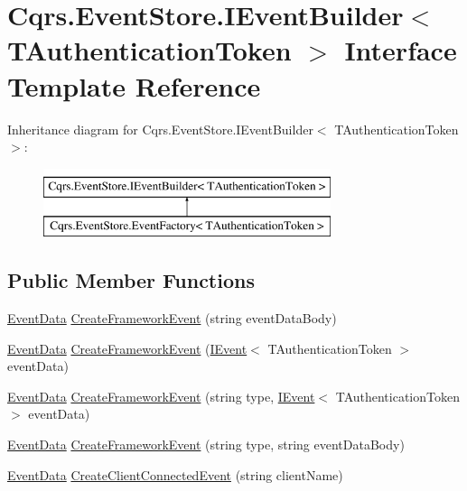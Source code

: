 \hypertarget{interfaceCqrs_1_1EventStore_1_1IEventBuilder}{}\section{Cqrs.\+Event\+Store.\+I\+Event\+Builder$<$ T\+Authentication\+Token $>$ Interface Template Reference}
\label{interfaceCqrs_1_1EventStore_1_1IEventBuilder}
Inheritance diagram for Cqrs.\+Event\+Store.\+I\+Event\+Builder$<$ T\+Authentication\+Token $>$\+:\begin{figure}[H]
\begin{center}
\leavevmode
\includegraphics[height=2.000000cm]{interfaceCqrs_1_1EventStore_1_1IEventBuilder}
\end{center}
\end{figure}
\subsection*{Public Member Functions}
\begin{DoxyCompactItemize}
\item 
\hyperlink{classCqrs_1_1Events_1_1EventData}{Event\+Data} \hyperlink{interfaceCqrs_1_1EventStore_1_1IEventBuilder_a341d5c54ef8a271a8248e0a5266e6228_a341d5c54ef8a271a8248e0a5266e6228}{Create\+Framework\+Event} (string event\+Data\+Body)
\item 
\hyperlink{classCqrs_1_1Events_1_1EventData}{Event\+Data} \hyperlink{interfaceCqrs_1_1EventStore_1_1IEventBuilder_a8ee9560f7b53c67b9946c3b0719eca96_a8ee9560f7b53c67b9946c3b0719eca96}{Create\+Framework\+Event} (\hyperlink{interfaceCqrs_1_1Events_1_1IEvent}{I\+Event}$<$ T\+Authentication\+Token $>$ event\+Data)
\item 
\hyperlink{classCqrs_1_1Events_1_1EventData}{Event\+Data} \hyperlink{interfaceCqrs_1_1EventStore_1_1IEventBuilder_ab9608f44e12ce029fc98ad0eee53516a_ab9608f44e12ce029fc98ad0eee53516a}{Create\+Framework\+Event} (string type, \hyperlink{interfaceCqrs_1_1Events_1_1IEvent}{I\+Event}$<$ T\+Authentication\+Token $>$ event\+Data)
\item 
\hyperlink{classCqrs_1_1Events_1_1EventData}{Event\+Data} \hyperlink{interfaceCqrs_1_1EventStore_1_1IEventBuilder_a8e3df7af1f54ac873d1a768b78b82c6d_a8e3df7af1f54ac873d1a768b78b82c6d}{Create\+Framework\+Event} (string type, string event\+Data\+Body)
\item 
\hyperlink{classCqrs_1_1Events_1_1EventData}{Event\+Data} \hyperlink{interfaceCqrs_1_1EventStore_1_1IEventBuilder_ae11ead7fa69632041e081e60f51c4e9f_ae11ead7fa69632041e081e60f51c4e9f}{Create\+Client\+Connected\+Event} (string client\+Name)
\end{DoxyCompactItemize}


